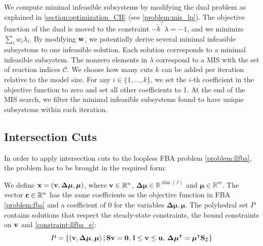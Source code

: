 
We compute minimal infeasible subsystems by modifying the dual problem as explained in \cref{section:optimization_CB} (see \cref{problem:mis_lp}). 
The objective function of the dual is moved to the constraint $-\tilde{b}^\intercal \lambda = -1$, and we minimize $\sum_i w_i \lambda_i$. By modifying $\bold w$, we potentially derive several minimal infeasible subsystems to one infeasible solution. Each solution corresponds to a minimal infeasible subsystem. The nonzero elements in $\lambda$ correspond to a MIS with the set of reaction indices $\mathcal{C}$. We choose how many cuts $k$ can be added per iteration relative to the model size. For any $i \in \{1,...,k\}$, we set the $i$-th coefficient in the objective function to zero and set all other coefficients to 1. At the end of the MIS search, we filter the minimal infeasible subsystems found to have unique subsystems within each iteration.


\subsection{Intersection Cuts} \label{section:methods_interscetion_cuts}
In order to apply intersection cuts to the loopless FBA problem \cref{problem:llfba}, the problem has to be brought in the required form:
We define $\bold x = (\bold v, \boldsymbol{\Delta \mu}, \boldsymbol\mu)$, where $\bold v \in \mathbb{R}^n$, $\boldsymbol{\Delta \mu} \in \mathbb{R}^{\dim (\mathcal{I})}$ and $\boldsymbol \mu \in \mathbb{R}^m$. The vector $\bold c \in \mathbb{R}^n$ has the same coefficients as the objective function in FBA \cref{problem:fba} and a coefficient of $0$ for the variables $\boldsymbol{\Delta \mu}, \boldsymbol \mu$. The polyhedral set $P$ contains solutions that respect the steady-state constraints, the bound constraints on $\bold v$ and \cref{constraint:llfba_e}:
\begin{equation*}
    \centering
    P = \{(\bold v, \boldsymbol{\Delta \mu}, \boldsymbol\mu) \, | \, \bold S \bold v= \bold 0, \, \bold l \leq \bold v \leq \bold u, \, \boldsymbol{\Delta \mu}^\intercal = \boldsymbol \mu^\intercal \bold S_{\mathcal{I}}\}
\end{equation*}

